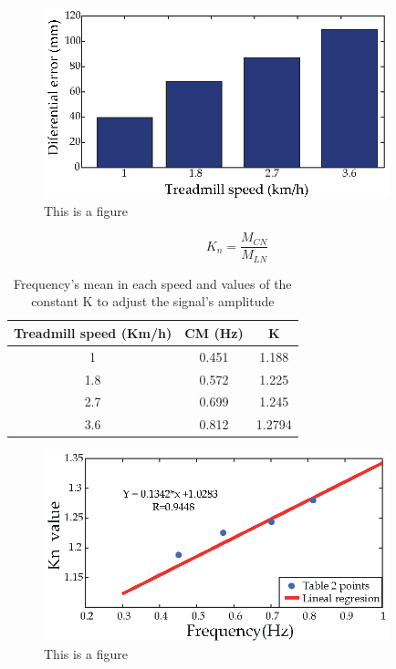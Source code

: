 \documentclass[journal,article,submit,moreauthors,pdftex,10pt,a4paper]{mdpi}
\theoremstyle{mdpi}
\newcounter{ex}
\newcounter{re}
\theoremstyle{mdpidefinition}
\begin{document}
\begin{figure}[H]
\centering
\includegraphics[width=10cm]{bar_graph_speed_vs_error.eps}
\caption{This is a figure}
\end{figure} 

\begin{equation}
K_{n} = \frac{M_{CN}}{M_{LN}}
\end{equation}


\begin{table}[H]
\caption{Frequency's mean in each speed and values of the constant K to adjust the signal's amplitude}
\small %
\centering
\begin{tabular}{ccc}
\toprule
\textbf{Treadmill speed (Km/h)}	& \textbf{CM (Hz)}	& \textbf{K}\\
\midrule
1 		& 0.451 	& 1.188\\
1.8		& 0.572 	& 1.225\\
2.7 	& 0.699 	& 1.245\\
3.6 	& 0.812 	& 1.2794\\

\bottomrule
\end{tabular}
\end{table}

\begin{figure}[H]
\centering
\includegraphics[width=10cm]{Kmodel.eps}
\caption{This is a figure}
\end{figure} 
\end{document}
